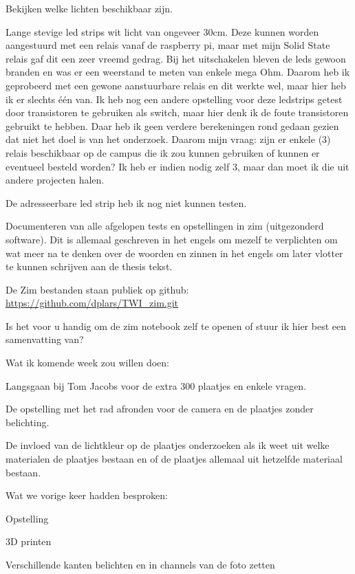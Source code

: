 \documentclass{article}
\begin{document}
Bekijken welke lichten beschikbaar zijn.

Lange stevige led strips wit licht van ongeveer 30cm. Deze kunnen worden aangestuurd met een relais vanaf de raspberry pi, maar met mijn Solid State relais gaf dit een zeer vreemd gedrag. Bij het uitschakelen bleven de leds gewoon branden en was er een weerstand te meten van enkele mega Ohm. Daarom heb ik geprobeerd met een gewone aanstuurbare relais en dit werkte wel, maar hier heb ik er slechts één van. Ik heb nog een andere opstelling voor deze ledstrips getest door transistoren te gebruiken als switch, maar hier denk ik de foute transistoren gebruikt te hebben. Daar heb ik geen verdere berekeningen rond gedaan gezien dat niet het doel is van het onderzoek. Daarom mijn vraag: zijn er enkele (3) relais beschikbaar op de campus die ik zou kunnen gebruiken of kunnen er eventueel besteld worden? Ik heb er indien nodig zelf 3, maar dan moet ik die uit andere projecten halen.

De adresseerbare led strip heb ik nog niet kunnen testen.

Documenteren van alle afgelopen tests en opstellingen in zim (uitgezonderd software). Dit is allemaal geschreven in het engels om mezelf te verplichten om wat meer na te denken over de woorden en zinnen in het engels om later vlotter te kunnen schrijven aan de thesis tekst.

De Zim bestanden staan publiek op github: \href{https://github.com/dplars/TWI_zim.git}{https://github.com/dplars/TWI\_zim.git}

Is het voor u handig om de zim notebook zelf te openen of stuur ik hier best een samenvatting van?

 

Wat ik komende week zou willen doen:

Langsgaan bij Tom Jacobs voor de extra 300 plaatjes en enkele vragen.

De opstelling met het rad afronden voor de camera en de plaatjes zonder belichting.

De invloed van de lichtkleur op de plaatjes onderzoeken als ik weet uit welke materialen de plaatjes bestaan en of de plaatjes allemaal uit hetzelfde materiaal bestaan.

 

Wat we vorige keer hadden besproken:

Opstelling

3D printen

Verschillende kanten belichten en in channels van de foto zetten
\end{document}
